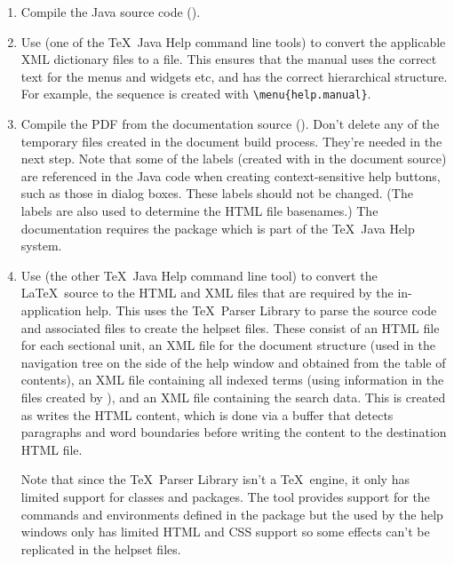 \begin{enumerate}
\item Compile the Java source code ().

\item Use  (one of the \TeX\ Java Help command
line tools) to convert the applicable XML dictionary files to 
a  file. This ensures that the manual uses the
correct text for the menus and widgets etc, and has the correct
hierarchical structure. For example, the sequence
 is created with
\verb|\menu{help.manual}|.

\item Compile the PDF from the documentation source
(). Don't delete any of the temporary
files created in the document build process. They're needed in the
next step. Note that some of the labels (created with 
in the document source) are referenced in the Java code when
creating context-sensitive help buttons, such as those in dialog
boxes. These labels should not be changed. (The labels are also used
to determine the HTML file basenames.)
The documentation requires the  package which is
part of the \TeX\ Java Help system.

\item Use  (the other \TeX\ Java Help command
line tool) to convert the \LaTeX\ source to the HTML and XML files
that are required by the in-application help.
This uses the \TeX\ Parser Library to parse the source code and 
associated files to create the helpset files. These consist of an
HTML file for each sectional unit, an XML file for the document
structure (used in the navigation tree on the side of the help
window and obtained from the table of contents), 
an XML file containing all indexed terms (using
information in the files created by ), and
an XML file containing the search data. This is created as
 writes the HTML content, which is done via a
buffer that detects paragraphs and word boundaries before writing
the content to the destination HTML file.

Note that since the \TeX\ Parser Library isn't a \TeX\ engine, it
only has limited support for classes and packages. The
 tool provides support for the commands and
environments defined in the  package but
the  used by the help windows only has limited
HTML and CSS support so some effects can't be replicated in the
helpset files.

\end{enumerate}

